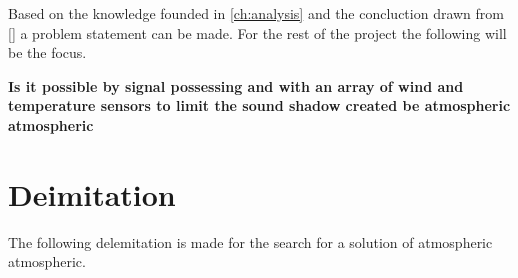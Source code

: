 Based on the knowledge founded in \autoref{ch:analysis} and the concluction drawn from \autoref{} a problem statement can be made. For the rest of the project the following will be the focus.


\textbf{Is it possible by signal possessing and with an array of wind and temperature sensors to limit the sound shadow created be atmospheric atmospheric}

\section{Deimitation}
The following delemitation is made for the search for a solution of atmospheric atmospheric.